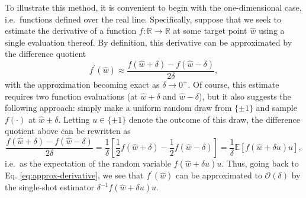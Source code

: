 To illustrate this method, it is convenient to begin with the one-dimensional case, i.e.\ functions defined over the real line. Specifically, suppose that we seek to estimate the derivative of a function $f : \mathbb{R} \rightarrow \mathbb{R}$ at some target point $\hat{w}$ using a single evaluation thereof. By definition, this derivative can be approximated by the difference quotient
\begin{equation}
\label{eq:approx-derivative}
	f^\prime(\hat{w})
	\approx \frac{f(\hat{w} + \delta) - f(\hat{w} - \delta)}{2\delta},
\end{equation}
with the approximation becoming exact as $\delta \rightarrow 0^+$. Of course, this estimate requires two function evaluations (at $\hat{w} + \delta$ and $\hat{w} - \delta$), but it also suggests the following approach: simply make a uniform random draw from $\{\pm 1\}$ and sample $f(\cdot)$ at $\hat{w} \pm \delta$. Letting $u \in \{\pm 1\}$ denote the outcome of this draw, the difference quotient above can be rewritten as
\begin{equation}
	\frac{f(\hat{w} + \delta) - f(\hat{w} - \delta)}{2\delta}
	= \frac{1}{\delta}\left[\frac{1}{2}f(\hat{w} + \delta) - \frac{1}{2}f(\hat{w} - \delta)\right]
	= \frac{1}{\delta}\mathbb{E}[f(\hat{w} + \delta u)u],
\end{equation}
i.e.\ as the expectation of the random variable $f(\hat{w} + \delta u)u$. Thus, going back to Eq. \eqref{eq:approx-derivative}, we see that $f^\prime(\hat{w})$ can be approximated to $\mathcal{O}(\delta)$ by the single-shot estimator $\delta^{-1}f(\hat{w} + \delta u)u$.

